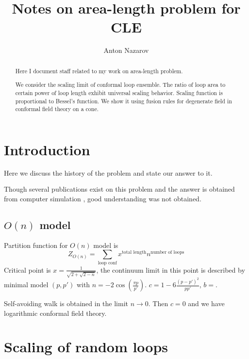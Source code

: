 \documentclass[12pt]{article}
\begin{document}
\title{Notes on area-length problem for CLE}
\author{Anton Nazarov}%

\maketitle

\begin{abstract}
  Here I document staff related to my work on area-length problem.

  We consider the scaling limit of conformal loop ensemble. The ratio
  of loop area to certain power of loop length exhibit universal
  scaling behavior. Scaling function is proportional to Bessel's
  function. We show it using fusion rules for degenerate field in
  conformal field theory on a cone. 
\end{abstract}

\section{Introduction}
\label{sec:introduction}

Here we discuss the history of the problem and state our answer to it. 

Though several publications exist
\cite{cardy2003exact,cardy2003crossover,cardy2001exact,cardy1994geometrical}
on this problem and the answer is
obtained from computer simulation \cite{richard2001scaling}, good understanding was not
obtained. 

\subsection{$O(n)$ model}
\label{sec:introduction-1}

Partition function for $O(n)$ model is
\begin{equation}
  \label{eq:9}
  Z_{O(n)} = \sum_{\mbox{loop conf}} x^{\mbox{total length}}
  n^{\mbox{number of loops}}
\end{equation}
Critical point is $x=\frac{1}{\sqrt{2+\sqrt{2-n}}}$, the continuum
limit in this point is described by minimal model $(p,p')$ with
$n=-2\cos\left(\frac{\pi p}{p'}\right)$. $c=1-6\frac{(p-p')^2}{pp'}$, $b=$.

Self-avoiding walk is obtained in the limit $n\to 0$. Then $c=0$ and
we have logarithmic conformal field theory. 

\section{Scaling of random loops}
\label{sec:scaling-random-loops}
\end{document}
